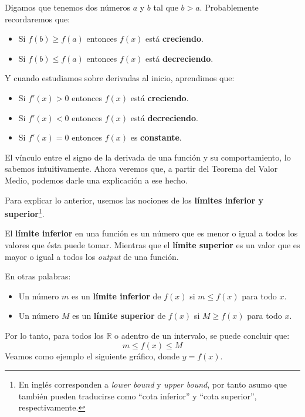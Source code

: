 \documentclass[12pt]{article}
\begin{document}
Digamos que tenemos dos números $a$ y $b$ tal que $b > a$. Probablemente recordaremos que:

\begin{itemize}
\item Si $f(b) \geq f(a)$ entonces $f(x)$ está \textbf{creciendo}.
\item Si $f(b) \leq f(a)$ entonces $f(x)$ está \textbf{decreciendo}.
\end{itemize}

Y cuando estudiamos sobre derivadas al inicio, aprendimos que:

\begin{itemize}
\item Si $f'(x) > 0$ entonces $f(x)$ está \textbf{creciendo}.
\item Si $f'(x) < 0$ entonces $f(x)$ está \textbf{decreciendo}.
\item Si $f'(x) = 0$ entonces $f(x)$ es \textbf{constante}.
\end{itemize}

El vínculo entre el signo de la derivada de una función y su comportamiento, lo sabemos intuitivamente. Ahora veremos que, a partir del Teorema del Valor Medio, podemos darle una explicación a ese hecho.

Para explicar lo anterior, usemos las nociones de los \textbf{límites inferior y superior}\footnote{En inglés corresponden a \textit{lower bound} y \textit{upper bound}, por tanto asumo que también pueden traducirse como ``cota inferior'' y ``cota superior'', respectivamente.}.

El \textbf{límite inferior} en una función es un número que es menor o igual a todos los valores que ésta puede tomar. Mientras que el \textbf{límite superior} es un valor que es mayor o igual a todos los \textit{output} de una función.

En otras palabras:

\begin{itemize}
\item Un número $m$ es un \textbf{límite inferior} de $f(x)$ si $m \leq f(x)$ para todo $x$.
\item Un número $M$ es un \textbf{límite superior} de $f(x)$ si $M \geq f(x)$ para todo $x$.
\end{itemize}

Por lo tanto, para todos los $\mathbb{R}$ o adentro de un intervalo, se puede concluir que:
\[
  m \leq f(x) \leq M
\]
Veamos como ejemplo el siguiente gráfico, donde $y = f(x)$.
\end{document}
